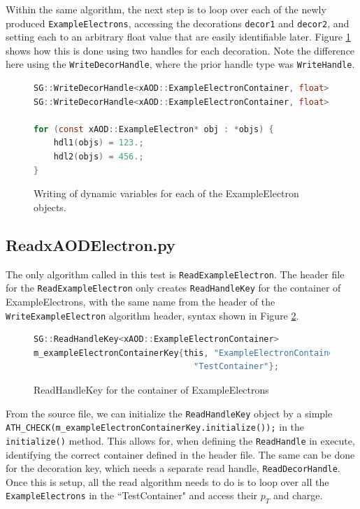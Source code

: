 Within the same algorithm, the next step is to loop over each of the newly produced \verb|ExampleElectrons|, accessing the decorations \verb|decor1| and \verb|decor2|, and setting each to an arbitrary float value that are easily identifiable later.
Figure \ref{fig:Mod_utests_WritexAODElectron2} shows how this is done using two handles for each decoration. 
Note the difference here using the \verb|WriteDecorHandle|, where the prior handle type was \verb|WriteHandle|.
\begin{figure}[h]
    \centering
\begin{lstlisting}[language=C]
SG::WriteDecorHandle<xAOD::ExampleElectronContainer, float> hdl1(m_decor1Key,ctx);
SG::WriteDecorHandle<xAOD::ExampleElectronContainer, float> hdl2(m_decor2Key,ctx);

for (const xAOD::ExampleElectron* obj : *objs) {
    hdl1(objs) = 123.;
    hdl2(objs) = 456.;
}
\end{lstlisting}
    \caption{Writing of dynamic variables for each of the ExampleElectron objects.}
    \label{fig:Mod_utests_WritexAODElectron2}
\end{figure}


\subsection{ReadxAODElectron.py}
The only algorithm called in this test is \verb|ReadExampleElectron|.
The header file for the \verb|ReadExampleElectron| only creates \verb|ReadHandleKey| for the container of ExampleElectrons, with the same name from the header of the \verb|WriteExampleElectron| algorithm header, syntax shown in Figure \ref{fig:Mod_utests_ReadxAODElectron1}.
\begin{figure}[h]
    \centering
\begin{lstlisting}[language=C]
SG::ReadHandleKey<xAOD::ExampleElectronContainer>
m_exampleElectronContainerKey{this, "ExampleElectronContainerName",
                                "TestContainer"};
\end{lstlisting}
    \caption{ReadHandleKey for the container of ExampleElectrons}
    \label{fig:Mod_utests_ReadxAODElectron1}
\end{figure}
From the source file, we can initialize the \verb|ReadHandleKey| object by a simple \verb|ATH_CHECK(m_exampleElectronContainerKey.initialize());| in the \verb|initialize()| method.
This allows for, when defining the \verb|ReadHandle| in execute, identifying the correct container defined in the header file.
The same can be done for the decoration key, which needs a separate read handle, \verb|ReadDecorHandle|. 
Once this is setup, all the read algorithm needs to do is to loop over all the \verb|ExampleElectrons| in the ``TestContainer" and access their $p_T$ and charge.

